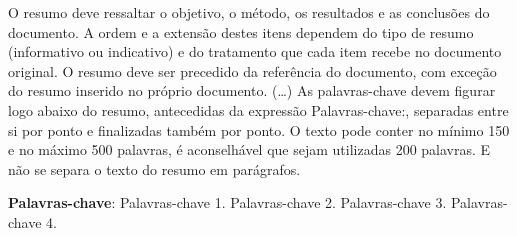 

\begin{resumo}[Resumo]

    O resumo deve ressaltar o objetivo, o método, os resultados e as conclusões do documento. A ordem e a extensão destes itens dependem do tipo de resumo (informativo ou indicativo) e do tratamento que cada item recebe no documento original. O resumo deve ser precedido da referência do documento, com exceção do resumo inserido no próprio documento. (\ldots) As palavras-chave devem figurar logo abaixo do resumo, antecedidas da expressão Palavras-chave:, separadas entre si por ponto e finalizadas também por ponto. O texto pode conter no mínimo 150 e no máximo 500 palavras, é aconselhável que sejam utilizadas 200 palavras. E não se separa o texto do resumo em parágrafos.

\vspace{\onelineskip}
\noindent
\textbf{Palavras-chave}: Palavras-chave 1. Palavras-chave 2. Palavras-chave 3. Palavras-chave 4.
\end{resumo}